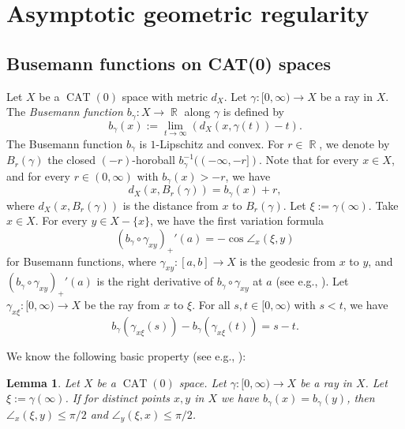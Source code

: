 \documentclass[a4paper,12pt]{amsart}
\newcommand{\CAT}{\operatorname{CAT}}
\newcommand{\R}{\operatorname{\mathbb{R}}}
\numberwithin{equation}{section}
\theoremstyle{plain}
\newtheorem{lem}[thm]{Lemma}
\theoremstyle{definition}
\theoremstyle{remark}
\begin{document}
\section{Asymptotic geometric regularity}

\subsection{Busemann functions on CAT(0) spaces}

Let $X$ be a $\CAT(0)$ space with metric $d_X$.
Let $\gamma \colon [0,\infty) \to X$ be a ray in $X$.
The \emph{Busemann function $b_{\gamma} \colon X \to \R$} 
along $\gamma$
is defined by
\[
b_{\gamma}(x) := 
\lim_{t \to \infty} \left( d_X \left( x, \gamma(t) \right) - t \right).
\]
The Busemann function $b_{\gamma}$ is $1$-Lipschitz and convex.
For $r \in \R$, 
we denote by $B_r(\gamma)$
the closed $(-r)$-horoball $b_{\gamma}^{-1} ((-\infty,-r])$.
Note that
for every $x \in X$,
and for every $r \in (0,\infty)$ with $b_{\gamma}(x) > -r$,
we have
\begin{equation}
d_X \left( x, B_r(\gamma) \right) = b_{\gamma}(x) + r,
\label{eqn: horoball}
\end{equation}
where $d_X \left( x, B_r(\gamma) \right)$ is the distance 
from $x$ to $B_r(\gamma)$.
Let $\xi := \gamma(\infty)$.
Take $x \in X$.
For every $y \in X - \{ x \}$,
we have the first variation formula 
\begin{equation}
(b_{\gamma} \circ \gamma_{xy})_+'(a) = - \cos \angle_x (\xi,y)
\label{eqn: 1vfb}
\end{equation}
for Busemann functions,
where
$\gamma_{xy} \colon [a,b] \to X$ is the geodesic 
from $x$ to $y$,
and $(b_{\gamma} \circ \gamma_{xy})_+'(a)$
is the right derivative of $b_{\gamma} \circ \gamma_{xy}$ at $a$
(see e.g., \cite[Lemma 3.3]{fujiwara-nagano-shioya}).
Let $\gamma_{x\xi} \colon [0,\infty) \to X$ be the ray 
from $x$ to $\xi$.
For all $s, t \in [0,\infty)$ with $s < t$,
we have
\begin{equation}
b_{\gamma} \left( \gamma_{x\xi}(s) \right) - 
b_{\gamma} \left( \gamma_{x\xi}(t) \right)
= s-t.
\label{eqn: lebelb}
\end{equation}

We know the following basic property
(see e.g., \cite[Lemma 5.1]{nagano5}):

\begin{lem}\label{lem: busemann-level}
Let $X$ be a $\CAT(0)$ space.
Let $\gamma \colon [0,\infty) \to X$ be a ray in $X$.
Let $\xi := \gamma(\infty)$.
If for distinct points $x, y$ in $X$ we have
$b_{\gamma}(x) = b_{\gamma}(y)$,
then
$\angle_x (\xi,y) \le \pi/2$ and
$\angle_y (\xi,x) \le \pi/2$.
\end{lem}
\end{document}
